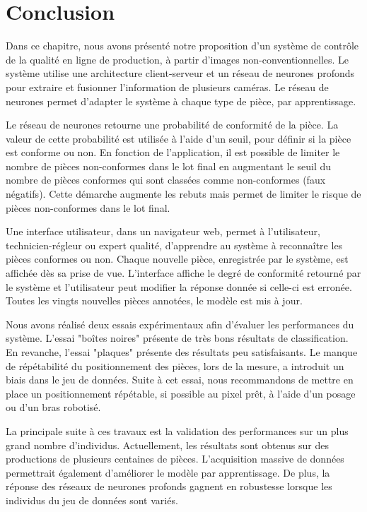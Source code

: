 \newpage
\section{Conclusion}
\vspace{-3mm}
Dans ce chapitre, nous avons présenté notre proposition d'un système de contrôle de la qualité en ligne de production, à partir d'images non-conventionnelles.
Le système utilise une architecture client-serveur et un réseau de neurones profonds pour extraire et fusionner l'information de plusieurs caméras.
Le réseau de neurones permet d'adapter le système à chaque type de pièce, par apprentissage.

Le réseau de neurones retourne une probabilité de conformité de la pièce.
La valeur de cette probabilité est utilisée à l'aide d'un seuil, pour définir si la pièce est conforme ou non.
En fonction de l'application, il est possible de limiter le nombre de pièces non-conformes dans le lot final en augmentant le seuil du nombre de pièces conformes qui sont classées comme non-conformes (faux négatifs).
Cette démarche augmente les rebuts mais permet de limiter le risque de pièces non-conformes dans le lot final.

Une interface utilisateur, dans un navigateur web, permet à l'utilisateur, technicien-régleur ou expert qualité, d'apprendre au système à reconnaître les pièces conformes ou non.
Chaque nouvelle pièce, enregistrée par le système, est affichée dès sa prise de vue.
L'interface affiche le degré de conformité retourné par le système et l'utilisateur peut modifier la réponse donnée si celle-ci est erronée.
Toutes les vingts nouvelles pièces annotées, le modèle est mis à jour.

Nous avons réalisé deux essais expérimentaux afin d'évaluer les performances du système.
L'essai "boîtes noires" présente de très bons résultats de classification.
En revanche, l'essai "plaques" présente des résultats peu satisfaisants.
Le manque de répétabilité du positionnement des pièces, lors de la mesure, a introduit un biais dans le jeu de données.
Suite à cet essai, nous recommandons de mettre en place un positionnement répétable, si possible au pixel prêt, à l'aide d'un posage ou d'un bras robotisé.

La principale suite à ces travaux est la validation des performances sur un plus grand nombre d'individus.
Actuellement, les résultats sont obtenus sur des productions de plusieurs centaines de pièces.
L'acquisition massive de données permettrait également d'améliorer le modèle par apprentissage.
De plus, la réponse des réseaux de neurones profonds gagnent en robustesse lorsque les individus du jeu de données sont variés.

